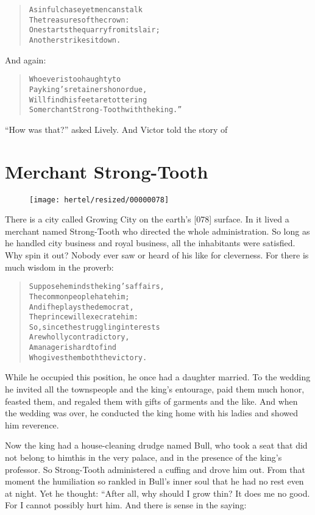 \documentclass[article, twoside, 10pt]{memoir}
\renewenvironment{verbatim}{%
\begin{quote}%
\vskip -10pt%
\begin{alltt}\normalfont\small}{\end{alltt}%
\end{quote}%
\vskip -10pt
} %
\begin{document}
\begin{verbatim}
A sinful chase{\textemdash}yet men can stalk
    The treasures of the crown:
One starts the quarry from its lair;
    Another strikes it down.
\end{verbatim}
And again:

\begin{verbatim}
Whoever is too haughty to
Pay king's retainers honor due,
Will find his feet are tottering{\textemdash}
So merchant Strong-Tooth with the king.”
\end{verbatim}
``How was that?'' asked Lively. And Victor told the story of

\chapter{Merchant Strong-Tooth}

\begin{figure}[p]\texttt{[image: hertel/resized/00000078]}\end{figure}There is a city called Growing City on the earth's [078] surface.
In it lived a merchant named Strong-Tooth who directed the whole
administration. So long as he handled city business and royal
business, all the inhabitants were satisfied. Why spin it out?
Nobody ever saw or heard of his like for cleverness. For there is
much wisdom in the proverb:

\begin{verbatim}
Suppose he minds the king's affairs,
    The common people hate him;
And if he plays the democrat,
    The prince will execrate him:
So, since the struggling interests
    Are wholly contradictory,
A manager is hard to find
    Who gives them both the victory.
\end{verbatim}
While he occupied this position, he once had a daughter married. To
the wedding he invited all the townspeople and the king's
entourage, paid them much honor, feasted them, and regaled them
with gifts of garments and the like. And when the wedding was over,
he conducted the king home with his ladies and showed him
reverence.

Now the king had a house-cleaning drudge named Bull, who took a
seat that did not belong to him{\textemdash}this in the very palace, and in
the presence of the king's professor. So Strong-Tooth administered
a cuffing and drove him out. From that moment the humiliation so
rankled in Bull's inner soul that he had no rest even at night. Yet
he thought: “After all, why should I grow thin? It does me no good.
For I cannot possibly hurt him. And there is sense in the saying:
\end{document}
